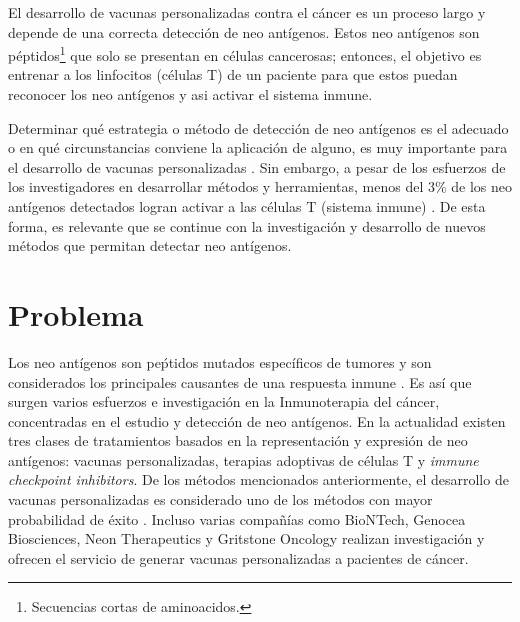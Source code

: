 
El desarrollo de vacunas personalizadas contra el cáncer es un proceso largo y depende de una correcta detección de neo antígenos. Estos neo antígenos son péptidos\footnote{Secuencias cortas de aminoacidos.} que solo se presentan en células cancerosas; entonces, el objetivo es entrenar a los linfocitos (células T) de un paciente para que estos puedan reconocer los neo antígenos y asi activar el sistema inmune.

Determinar qué estrategia o método de detección de neo antígenos es el adecuado o en qué circunstancias conviene la aplicación de alguno, es muy importante para el desarrollo de vacunas personalizadas \citep{de2020neoantigen, peng2019neoantigen}.  Sin embargo, a pesar de los esfuerzos de los investigadores en desarrollar métodos y herramientas,  menos del 3\% de los neo antígenos detectados logran activar a las células T (sistema inmune) \citep{de2020neoantigen}. De esta forma, es relevante que se continue con la investigación y desarrollo de nuevos métodos que permitan detectar neo antígenos.


\section{Problema}
\label{sec:problema}

Los neo antígenos son peṕtidos mutados específicos de tumores y son considerados los principales causantes de una respuesta inmune \citep{borden2022cancer, chen2021challenges, gopanenko2020main}. Es así que surgen varios esfuerzos e investigación en la Inmunoterapia del cáncer, concentradas en el estudio y detección de neo antígenos. En la actualidad existen tres clases de tratamientos basados en la representación y expresión de neo antígenos: vacunas personalizadas, terapias adoptivas de células T y \textit{immune checkpoint inhibitors}. De los métodos mencionados anteriormente, el desarrollo de vacunas personalizadas es considerado uno de los métodos con mayor probabilidad de éxito \citep{borden2022cancer}. Incluso varias compañías como BioNTech, Genocea Biosciences, Neon Therapeutics y Gritstone Oncology realizan investigación y ofrecen el servicio de generar vacunas personalizadas a pacientes de cáncer.

